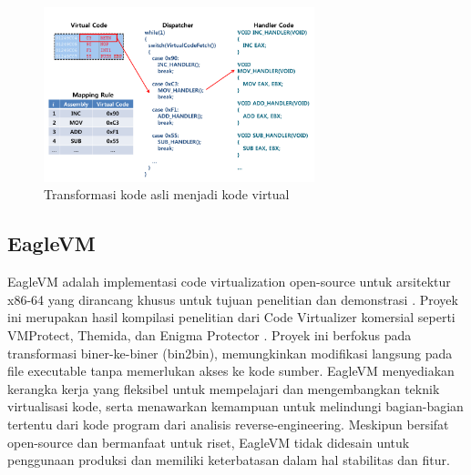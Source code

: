 \begin{figure}
	\centering
	\includegraphics[width=0.7\textwidth]
	{assets/pics/code_to_virtualized.png}
	\caption{Transformasi kode asli menjadi kode virtual \cite{Don20}}
	\label{F:transformation_virtualization}
\end{figure}

\subsection{EagleVM}
EagleVM adalah implementasi code virtualization open-source untuk arsitektur x86-64 yang dirancang khusus untuk tujuan penelitian dan demonstrasi \cite{Eag21}. Proyek ini merupakan hasil kompilasi penelitian dari Code Virtualizer komersial seperti VMProtect, Themida, dan Enigma Protector \cite{Ore06, Ore24, VMP24}. Proyek ini berfokus pada transformasi biner-ke-biner (bin2bin), memungkinkan modifikasi langsung pada file executable tanpa memerlukan akses ke kode sumber. EagleVM menyediakan kerangka kerja yang fleksibel untuk mempelajari dan mengembangkan teknik virtualisasi kode, serta menawarkan kemampuan untuk melindungi bagian-bagian tertentu dari kode program dari analisis reverse-engineering. Meskipun bersifat open-source dan bermanfaat untuk riset, EagleVM tidak didesain untuk penggunaan produksi dan memiliki keterbatasan dalam hal stabilitas dan fitur.

